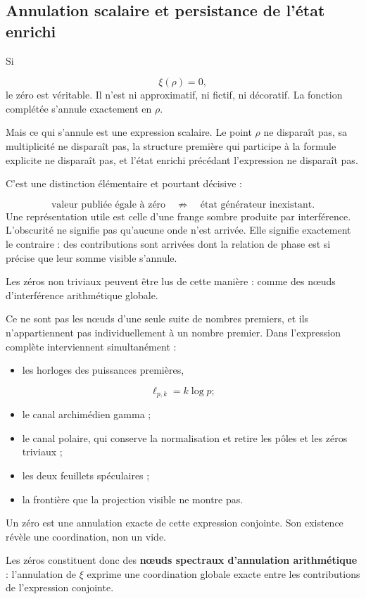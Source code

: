 \subsection{Annulation scalaire et persistance de l’état enrichi}
Si\par
\[
\xi(\rho)=0,
\]
le zéro est véritable. Il n’est ni approximatif, ni fictif, ni décoratif. La fonction complétée s’annule exactement en \(\rho\).\par
Mais ce qui s’annule est une expression scalaire. Le point \(\rho\) ne disparaît pas, sa multiplicité ne disparaît pas, la structure première qui participe à la formule explicite ne disparaît pas, et l’état enrichi précédant l’expression ne disparaît pas.\par
C’est une distinction élémentaire et pourtant décisive :\par
\[
\text{valeur publiée égale à zéro}
\quad\not\Rightarrow\quad
\text{état générateur inexistant}.
\]
Une représentation utile est celle d’une frange sombre produite par interférence. L’obscurité ne signifie pas qu’aucune onde n’est arrivée. Elle signifie exactement le contraire : des contributions sont arrivées dont la relation de phase est si précise que leur somme visible s’annule.\par
Les zéros non triviaux peuvent être lus de cette manière : comme des nœuds d’interférence arithmétique globale.\par
Ce ne sont pas les nœuds d’une seule suite de nombres premiers, et ils n’appartiennent pas individuellement à un nombre premier. Dans l’expression complète interviennent simultanément :\par
\begin{itemize}
\item les horloges des puissances premières,
\end{itemize}
\[
\ell_{p,k}=k\log p;
\]
\begin{itemize}
\item le canal archimédien gamma ;
\item le canal polaire, qui conserve la normalisation et retire les pôles et les zéros triviaux ;
\item les deux feuillets spéculaires ;
\item la frontière que la projection visible ne montre pas.
\end{itemize}
Un zéro est une annulation exacte de cette expression conjointe. Son existence révèle une coordination, non un vide.\par
Les zéros constituent donc des \textbf{nœuds spectraux d’annulation arithmétique} : l’annulation de \(\xi\) exprime une coordination globale exacte entre les contributions de l’expression conjointe.\par
{}

